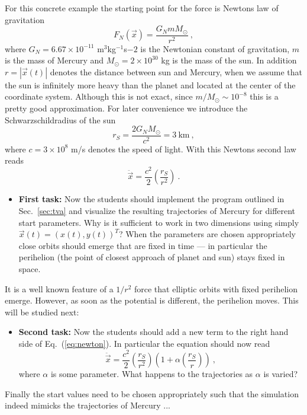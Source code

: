 \documentclass[12pt]{iopart}
\begin{document}
For this concrete example the starting point for the force is Newtons law
of gravitation
\begin{equation}
F_N(\vec x) = \frac{G_N m M_\odot}{r^2} \ ,
\end{equation}
where $G_N=6.67\times 10^{-11}$ m$^3$kg$^{-1}$s${-2}$ is the Newtonian constant of gravitation,
$m$ is the mass of Mercury and $M_\odot=2\times 10^{30}$ kg is the mass of the sun.
In addition $r=|\vec x(t)|$ denotes the distance between sun and Mercury, when we assume that the sun
is infinitely more heavy than the planet and located at the center of the coordinate system. Although this is not exact, since $m/M_\odot\sim 10^{-8}$ this is
a pretty good approximation. For later convenience we introduce the Schwarzschildradius of the sun
\begin{equation}
r_S=\frac{2G_N  M_\odot}{c^2} = 3 \ \mbox{km} \ ,
\end{equation}
where $c=3\times 10^8$ m/s denotes the speed of light.
With this Newtons second law reads 
\begin{equation}
\ddot{\vec x} = \frac{c^2}{2}\left(\frac{r_S}{r^2}\right) \ .
\label{eq:newton}
\end{equation}
\begin{itemize}
\item{\bf First task:}
Now the students should implement the program outlined in Sec.~\ref{sec:tva} and visualize the resulting
trajectories of Mercury for different start parameters.
Why is it sufficient to work in two dimensions using simply 
$\vec x(t)=(x(t),y(t))^T$?
 When the parameters are chosen appropriately close
orbits should emerge that are fixed in time --- in particular the perihelion (the point of closest approach
of planet and sun) stays fixed in space.
\end{itemize}
It is a well known feature of a $1/r^2$ force that elliptic orbits with fixed perihelion emerge. However, as soon
as the potential is different, the perihelion moves. This will be studied next:
\begin{itemize}
\item{\bf Second task:}
Now the students should add a new term to the right hand side of Eq.~(\ref{eq:newton}). In particular the equation should now
read 
\begin{equation}
\ddot{\vec x} = \frac{c^2}{2}\left(\frac{r_S}{r^2}\right)\left(1+\alpha\left(\frac{r_S}{r}\right)\right) \ ,
\label{eq:newton}
\end{equation}
where $\alpha$ is some parameter. What happens to the trajectories as $\alpha$ is varied?
\end{itemize}
Finally the start values need to be chosen appropriately such that the simulation indeed mimicks the trajectories
of Mercury ...
\end{document}
